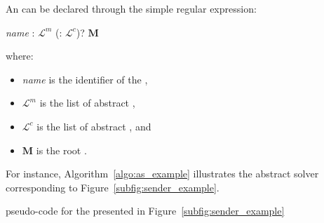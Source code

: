 An \as{} can be declared through the  simple regular expression:

\begin{center}
 {\it name} : $\mathcal{L}^m$ (: $\mathcal{L}^c$)?  $\mathbf{M}$ 
\end{center}

where:
\begin{itemize}
\item {\it name} is the identifier of the \as{}, 
\item $\mathcal{L}^m$ is the list of abstract \oms{},
\item $\mathcal{L}^c$ is the list of abstract \opchs{}, and
\item $\mathbf{M}$ is the root \cm.
\end{itemize}

For instance, Algorithm~\ref{algo:as_example} illustrates the abstract solver corresponding to Figure~\ref{subfig:sender_example}.%

\begin{algorithm}[H]
\dontprintsemicolon
\SetNoline
{}
\myproc{\tet{\bf abstract solver} as\_01\;
\tet{\bf computation} : $I, V, S, A$ \; 
\tet{\bf connection}: $C.M.$}{
	\Begin{
		$I\poslop{\mapsto}$
		\whileinline{$\left(\textbf{\Iter < } K_1\right)$}{
			$\left[V\poslop{\mapsto}S\poslop{\mapsto}\senddataop{A}\right]$ %
		}
	}
}
\caption{\posl{} pseudo-code for the \as{} presented in Figure~\ref{subfig:sender_example}}\label{algo:as_example}
\end{algorithm}	